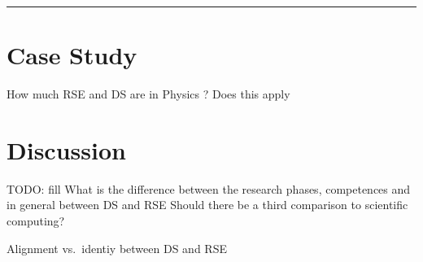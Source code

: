 \documentclass[
        english,biblatex
    ]{lni}
\begin{document}
    \begin{center}\rule{0.5\linewidth}{0.5pt}\end{center}

    \section{Case Study}\label{case-study}

    How much RSE and DS are in Physics ? \textcite{florian} Does this
    apply

    \section{Discussion}\label{discussion}

    TODO: fill What is the difference between the research phases,
    competences and in general between DS and RSE Should there be a
    third comparison to scientific computing?

    Alignment vs.~identiy between DS and RSE


    \printbibliography
\end{document}
